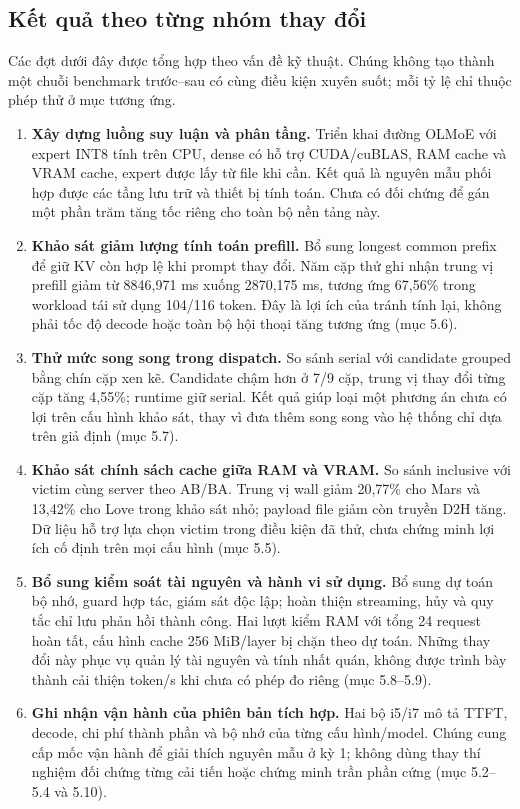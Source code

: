 \subsection{Kết quả theo từng nhóm thay đổi}

Các đợt dưới đây được tổng hợp theo vấn đề kỹ thuật. Chúng không tạo thành một chuỗi benchmark trước–sau có cùng điều kiện xuyên suốt; mỗi tỷ lệ chỉ thuộc phép thử ở mục tương ứng.

\begin{enumerate}
\item \textbf{Xây dựng luồng suy luận và phân tầng.} Triển khai đường OLMoE với expert INT8 tính trên CPU, dense có hỗ trợ CUDA/cuBLAS, RAM cache và VRAM cache, expert được lấy từ file khi cần. Kết quả là nguyên mẫu phối hợp được các tầng lưu trữ và thiết bị tính toán. Chưa có đối chứng để gán một phần trăm tăng tốc riêng cho toàn bộ nền tảng này.
\item \textbf{Khảo sát giảm lượng tính toán prefill.} Bổ sung longest common prefix để giữ KV còn hợp lệ khi prompt thay đổi. Năm cặp thử ghi nhận trung vị prefill giảm từ 8846,971 ms xuống 2870,175 ms, tương ứng 67,56\% trong workload tái sử dụng 104/116 token. Đây là lợi ích của tránh tính lại, không phải tốc độ decode hoặc toàn bộ hội thoại tăng tương ứng (mục 5.6).
\item \textbf{Thử mức song song trong dispatch.} So sánh serial với candidate grouped bằng chín cặp xen kẽ. Candidate chậm hơn ở 7/9 cặp, trung vị thay đổi từng cặp tăng 4,55\%; runtime giữ serial. Kết quả giúp loại một phương án chưa có lợi trên cấu hình khảo sát, thay vì đưa thêm song song vào hệ thống chỉ dựa trên giả định (mục 5.7).
\item \textbf{Khảo sát chính sách cache giữa RAM và VRAM.} So sánh inclusive với victim cùng server theo AB/BA. Trung vị wall giảm 20,77\% cho Mars và 13,42\% cho Love trong khảo sát nhỏ; payload file giảm còn truyền D2H tăng. Dữ liệu hỗ trợ lựa chọn victim trong điều kiện đã thử, chưa chứng minh lợi ích cố định trên mọi cấu hình (mục 5.5).
\item \textbf{Bổ sung kiểm soát tài nguyên và hành vi sử dụng.} Bổ sung dự toán bộ nhớ, guard hợp tác, giám sát độc lập; hoàn thiện streaming, hủy và quy tắc chỉ lưu phản hồi thành công. Hai lượt kiểm RAM với tổng 24 request hoàn tất, cấu hình cache 256 MiB/layer bị chặn theo dự toán. Những thay đổi này phục vụ quản lý tài nguyên và tính nhất quán, không được trình bày thành cải thiện token/s khi chưa có phép đo riêng (mục 5.8–5.9).
\item \textbf{Ghi nhận vận hành của phiên bản tích hợp.} Hai bộ i5/i7 mô tả TTFT, decode, chi phí thành phần và bộ nhớ của từng cấu hình/model. Chúng cung cấp mốc vận hành để giải thích nguyên mẫu ở kỳ 1; không dùng thay thí nghiệm đối chứng từng cải tiến hoặc chứng minh trần phần cứng (mục 5.2–5.4 và 5.10).
\end{enumerate}

